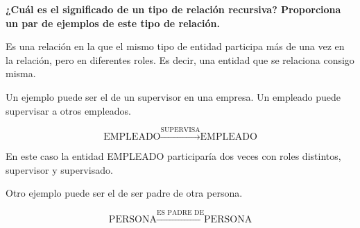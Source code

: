 \item \textbf{¿Cuál es el significado de un tipo de relación recursiva? Proporciona un par de ejemplos de este tipo de relación.}

Es una relación en la que el mismo tipo de entidad participa más de una vez en la relación, pero en diferentes roles. Es decir, una entidad que se relaciona consigo misma.

Un ejemplo puede ser el de un supervisor en una empresa. Un empleado puede supervisar a otros empleados.

\begin{equation*}
    \text{EMPLEADO} \xrightarrow{\text{SUPERVISA}} \text{EMPLEADO}
\end{equation*}

En este caso la entidad EMPLEADO participaría dos veces con roles distintos, supervisor y supervisado.

Otro ejemplo puede ser el de ser padre de otra persona.

\begin{equation*}
    \text{PERSONA} \xrightarrow{\text{ES PADRE DE}} \text{PERSONA}
\end{equation*}
